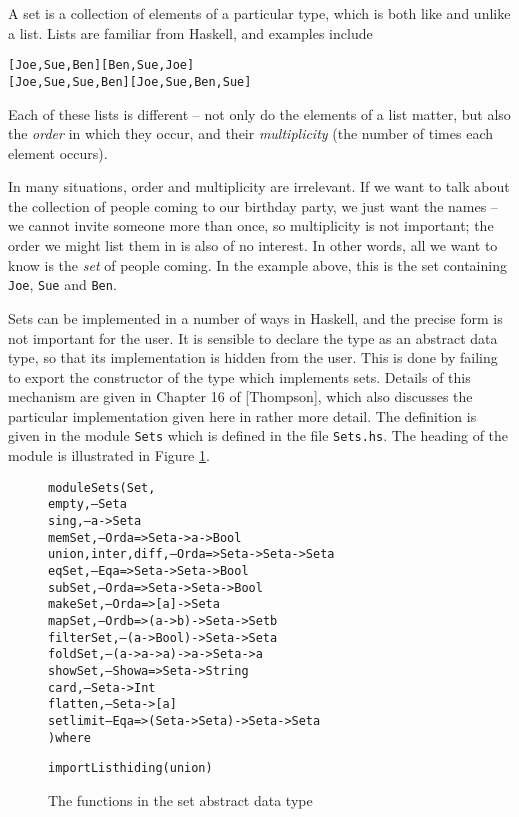 \documentclass[11pt]{article}
\begin{document}
A set is a collection of
elements of a particular type, which is both like and unlike a list. Lists are
familiar from Haskell, and examples include

\begin{alltt}
[Joe,Sue,Ben]     [Ben,Sue,Joe]
[Joe,Sue,Sue,Ben] [Joe,Sue,Ben,Sue]
\end{alltt}
Each of these lists is different -- not only do the elements of a list matter,
but also the {\em order\/} in which they occur, and their {\em multiplicity\/} 
(the number of times each element occurs).

In many situations, order and multiplicity are irrelevant. If we want to talk
about the collection of people coming to our birthday party, we just want the
names -- we cannot invite someone more than once, so multiplicity is not
important; the order we might list them in is also of no interest. In other
words, all we want to know is the {\em set\/} of people coming. In the example
above, this is the set containing {\tt Joe}, {\tt Sue} and {\tt Ben}.


Sets can be implemented in a number of ways in Haskell, and the precise form
is not important for the user. It is sensible to declare the type as an
abstract data type, so that its implementation is hidden from the user. This
is done by failing to export the constructor of the type which implements sets.
Details of this mechanism are given in Chapter 16 of [Thompson], which also discusses
the particular implementation given here in rather more detail. The definition is given 
in the module \texttt{Sets} which is defined in the file \texttt{Sets.hs}.
The heading of the module is illustrated in 
Figure \ref{setAbs}.
\begin{figure}
\begin{alltt}
module Sets ( Set ,
  empty              , -- Set a
  sing               , -- a -> Set a
  memSet             , -- Ord a => Set a -> a -> Bool
  union,inter,diff   , -- Ord a => Set a -> Set a -> Set a
  eqSet              , -- Eq a  => Set a -> Set a -> Bool
  subSet             , -- Ord a => Set a -> Set a -> Bool
  makeSet            , -- Ord a => [a] -> Set a
  mapSet             , -- Ord b => (a -> b) -> Set a -> Set b
  filterSet          , -- (a -> Bool) -> Set a -> Set a
  foldSet            , -- (a -> a -> a) -> a -> Set a -> a
  showSet            , -- Show a => Set a -> String
  card               , -- Set a -> Int
  flatten            , -- Set a -> [a]
  setlimit             -- Eq a => (Set a -> Set a) -> Set a -> Set a
  ) where

import List hiding ( union )
\end{alltt}
\caption{The functions in the set abstract data type}
\label{setAbs}
\end{figure}
\end{document}
